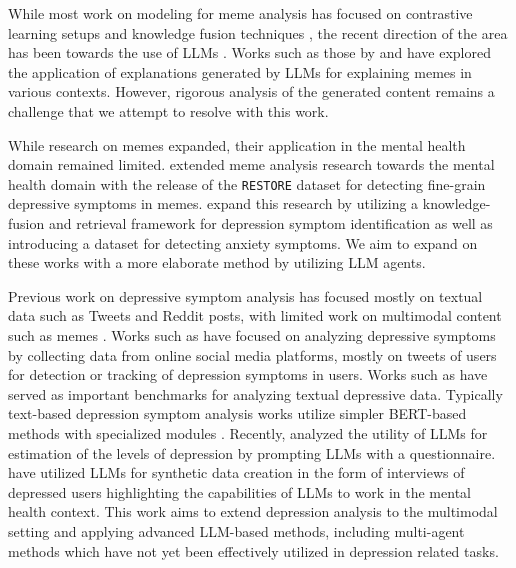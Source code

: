\documentclass[letterpaper]{article} %
\begin{document}
While most work on modeling for meme analysis has focused on contrastive learning setups \citep{mei-etal-2024-improving} and knowledge fusion techniques \citep{sharma-etal-2023-memex}, the recent direction of the area has been towards the use of LLMs \citep{jha-etal-2024-memeguard}. Works such as those by \citet{agarwal-etal-2024-mememqa} and \citet{zhong_multimodal_2024} have explored the application of explanations generated by LLMs for explaining memes in various contexts. However, rigorous analysis of the generated content remains a challenge that we attempt to resolve with this work. 


While research on memes expanded, their application in the mental health domain remained limited. \citet{Yadav-etal-2023-towards} extended meme analysis research towards the mental health domain with the release of the \texttt{RESTORE} dataset for detecting fine-grain depressive symptoms in memes. \citet{mazhar2025figurativecumcommonsenseknowledgeinfusionmultimodal} expand this research by utilizing a knowledge-fusion and retrieval framework for depression symptom identification as well as introducing a dataset for detecting anxiety symptoms. We aim to expand on these works with a more elaborate method by utilizing LLM agents.


Previous work on depressive symptom analysis has focused mostly on textual data such as Tweets and Reddit posts, with limited work on multimodal content such as memes \citep{Yadav-etal-2023-towards}. Works such as \citet{yadav-etal-2021-when, yadav-etal-2018-multi, benton-etal-2017-multitask} have focused on analyzing depressive symptoms by collecting data from online social media platforms, mostly on tweets of users for detection or tracking of depression symptoms in users. Works such as \citet{yates-etal-2017-depression, yadav2020identifying} have served as important benchmarks for analyzing textual depressive data. Typically text-based depression symptom analysis works utilize simpler BERT-based methods with specialized modules \cite{ZHANG2023103417}.  Recently, \citet{wang-etal-2024-explainable} analyzed the utility of LLMs for estimation of the levels of depression by prompting LLMs with a questionnaire. \citet{chen-etal-2024-depression} have utilized LLMs for synthetic data creation in the form of interviews of depressed users highlighting the capabilities of LLMs to work in the mental health context. This work aims to extend depression analysis to the multimodal setting and applying advanced LLM-based methods, including multi-agent methods which have not yet been effectively utilized in depression related tasks.
\end{document}
